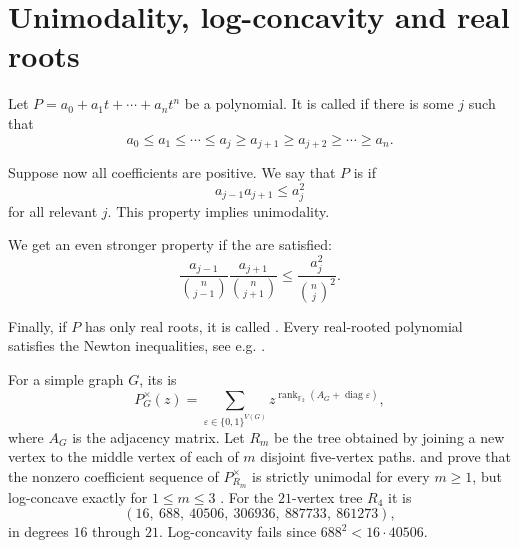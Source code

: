 \section[polynomialUnimodality]{Unimodality, log-concavity and real roots}

Let $P = a_0 + a_1t+\dotsb + a_n t^n$ be a polynomial.
It is called \label{unimodalPolynomial} if there is some $j$
such that
\[
a_0 \leq a_1 \leq \dotsb \leq a_j \geq a_{j+1}
\geq a_{j+2} \geq \dotsb \geq a_n.
\]

Suppose now all coefficients are positive. We say that \(P\) is
\label{logConcavePolynomial} if
\[
  a_{j-1}a_{j+1} \leq a_j^2
\]
for all relevant $j$. This property implies unimodality.

We get an even stronger property if the
\label{newtonInequalities} are satisfied:
\[
  \frac{a_{j-1}}{ \binom{n}{j-1} } \frac{a_{j+1}}{ \binom{n}{j+1} } \leq \frac{a_{j}^2}{ \binom{n}{j}^2 }.
\]

Finally, if $P$ has only real roots, it is called
\label{realRootedPolynomial}.
Every real-rooted polynomial satisfies the Newton inequalities, see e.g. \cite{Branden2015}.

\begin{example*}
\label{partialPetrialUnimodality}
For a simple graph $G$, its  is
\[
 P_G^\times(z)=\sum_{\varepsilon\in\{0,1\}^{V(G)}}
 z^{\operatorname{rank}_{\mathbb F_2}(A_G+\operatorname{diag}\varepsilon)},
\]
where $A_G$ is the adjacency matrix.
Let $R_m$ be the tree obtained by joining a new vertex to the middle
vertex of each of $m$ disjoint five-vertex paths.
 and  prove that the nonzero coefficient
sequence of $P_{R_m}^\times$ is strictly unimodal for every $m\geq1$,
but log-concave exactly for $1\leq m\leq3$
\cite[Thms.~8 and 11]{FengYan2026x}.
For the $21$-vertex tree $R_4$ it is
\[
 (16,\ 688,\ 40506,\ 306936,\ 887733,\ 861273),
\]
in degrees $16$ through $21$. Log-concavity fails since
$688^2<16\cdot40506$.
\end{example*}

